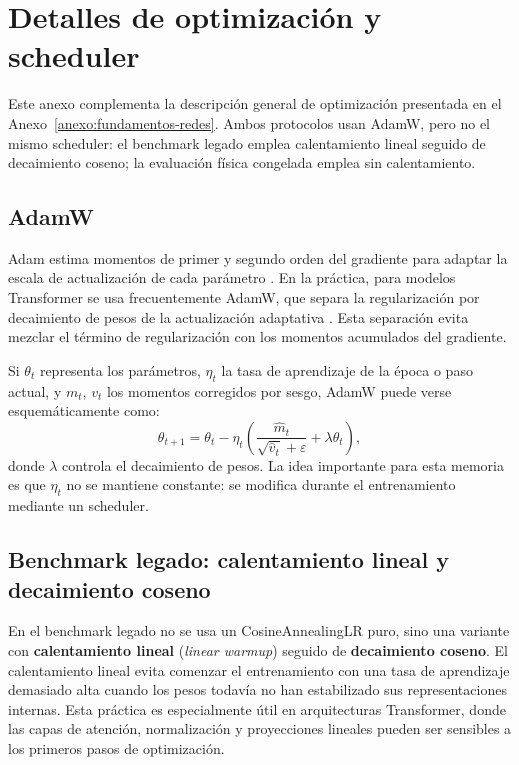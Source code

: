 \chapter{Detalles de optimización y scheduler}
\label{anexo:optimizacion-scheduler}

Este anexo complementa la descripción general de optimización presentada en el Anexo~\ref{anexo:fundamentos-redes}. Ambos protocolos usan AdamW, pero no el mismo scheduler: el benchmark legado emplea calentamiento lineal seguido de decaimiento coseno; la evaluación física congelada emplea  sin calentamiento.

\section{AdamW}
\label{anexo:adamw}

Adam estima momentos de primer y segundo orden del gradiente para adaptar la escala de actualización de cada parámetro \cite{kingma2015adam}. En la práctica, para modelos Transformer se usa frecuentemente AdamW, que separa la regularización por decaimiento de pesos de la actualización adaptativa \cite{loshchilov2019decoupled}. Esta separación evita mezclar el término de regularización con los momentos acumulados del gradiente.

Si $\theta_t$ representa los parámetros, $\eta_t$ la tasa de aprendizaje de la época o paso actual, y $m_t$, $v_t$ los momentos corregidos por sesgo, AdamW puede verse esquemáticamente como:
\begin{equation}
    \theta_{t+1}
    =
    \theta_t
    -
    \eta_t
    \left(
        \frac{\hat{m}_t}{\sqrt{\hat{v}_t}+\varepsilon}
        +
        \lambda \theta_t
    \right),
\end{equation}
donde $\lambda$ controla el decaimiento de pesos. La idea importante para esta memoria es que $\eta_t$ no se mantiene constante: se modifica durante el entrenamiento mediante un scheduler.

\section{Benchmark legado: calentamiento lineal y decaimiento coseno}
\label{anexo:warmup-cosine}

En el benchmark legado no se usa un CosineAnnealingLR puro, sino una variante con \textbf{calentamiento lineal} (\emph{linear warmup}) seguido de \textbf{decaimiento coseno}. El calentamiento lineal evita comenzar el entrenamiento con una tasa de aprendizaje demasiado alta cuando los pesos todavía no han estabilizado sus representaciones internas. Esta práctica es especialmente útil en arquitecturas Transformer, donde las capas de atención, normalización y proyecciones lineales pueden ser sensibles a los primeros pasos de optimización.

